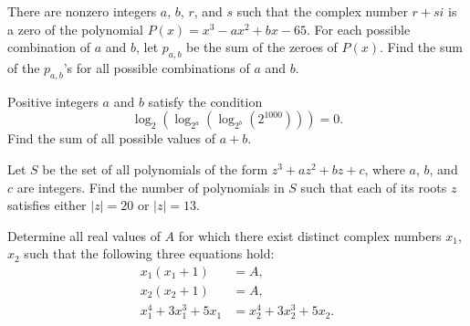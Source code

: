 \begin{question}[name={2013 AIME I, \href{https://artofproblemsolving.com/community/c4p2969823}{Problem 10}}]
	There are nonzero integers $a$, $b$, $r$, and $s$ such that the complex number $r+si$ is a zero of the polynomial $P(x) = x^3 - ax^2 + bx - 65$. For each possible combination of $a$ and $b$, let $p_{a,b}$ be the sum of the zeroes of $P(x)$. Find the sum of the $p_{a,b}$'s for all possible combinations of $a$ and $b$.	
	
\end{question}


%	





\begin{question}[name={2013 AIME II, \href{https://artofproblemsolving.com/community/c4p3003332}{Problem 2}}]
	Positive integers $a$ and $b$ satisfy the condition\[\log_2(\log_{2^a}(\log_{2^b}(2^{1000})))=0.\]Find the sum of all possible values of $a+b$.
\end{question}


%	







\begin{question}[name={2013 AIME II, \href{https://artofproblemsolving.com/community/c4p3003348}{Problem 12}}]
	Let $S$ be the set of all polynomials of the form $z^3+az^2+bz+c$, where $a$, $b$, and $c$ are integers. Find the number of polynomials in $S$ such that each of its roots $z$ satisfies either $\left\lvert z \right\rvert = 20$ or $\left\lvert z \right\rvert = 13$.
\end{question}


%	





\begin{question}[name={2013 HMMT, Algebra, \href{https://artofproblemsolving.com/community/c129h521095p2935114}{Problem 4}}]
	Determine all real values of $A$ for which there exist distinct complex numbers $x_1$, $x_2$ such that the following three equations hold:
	\begin{align*}x_1(x_1+1)&=A,\\x_2(x_2+1)&=A,\\x_1^4+3x_1^3+5x_1&=x_2^4+3x_2^3+5x_2.\end{align*}
\end{question}




